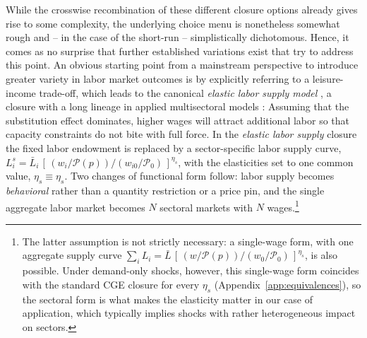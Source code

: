 While the crosswise recombination of these different closure options already gives rise to some complexity, the underlying choice menu is nonetheless somewhat rough and -- in the case of the short-run -- simplistically dichotomous. Hence, it comes as no surprise that further established variations exist that try to address this point. An obvious starting point from a mainstream perspective to introduce greater variety in labor market outcomes is by explicitly referring to a leisure-income trade-off, which leads to the canonical \textit{elastic labor supply model} \citep[see][112ff]{deMeloTarr.1992}, %
a closure with a long lineage in applied multisectoral models \citep[see][]{Dervis.1982}: Assuming that the substitution effect dominates, higher wages will attract additional labor so that capacity constraints do not bite with full force. In the \emph{elastic labor supply} closure the fixed labor endowment is replaced by a sector-specific labor supply curve, $L_i^{s} = \bar L_i\,[\,(w_i/\mathcal{P}(p))/(w_{i0}/\mathcal{P}_{0})\,]^{\eta_s}$, with the elasticities set to one common value, $\eta_s \equiv \eta_s$. Two changes of functional form follow: labor supply becomes \emph{behavioral} rather than a quantity restriction or a price pin, and the single aggregate labor market becomes $N$ sectoral markets with $N$ wages.\footnote{The latter assumption is not strictly necessary: a single-wage form, with one aggregate supply curve $\sum_i L_i = \bar L\,[\,(w/\mathcal{P}(p))/(w_{0}/\mathcal{P}_{0})\,]^{\eta_s}$, is also possible. Under demand-only shocks, however, this single-wage form coincides with the standard CGE closure for every $\eta_s$ (Appendix~\ref{app:equivalences}), so the sectoral form is what makes the elasticity matter in our case of application, which typically implies shocks with rather heterogeneous impact on sectors.}


